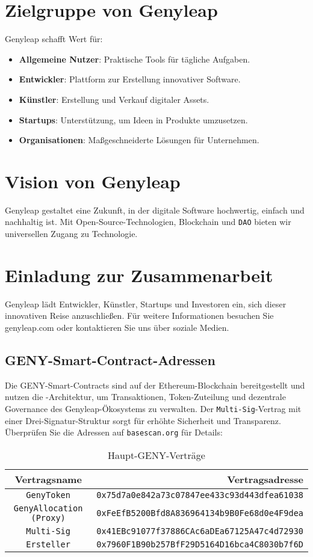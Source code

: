 \documentclass[a4paper,12pt,openany]{book}
\begin{document}
\chapter{Zielgruppe von Genyleap}
Genyleap schafft Wert für:
\begin{itemize}
    \item \textbf{Allgemeine Nutzer}: Praktische Tools für tägliche Aufgaben.
    \item \textbf{Entwickler}: Plattform zur Erstellung innovativer Software.
    \item \textbf{Künstler}: Erstellung und Verkauf digitaler Assets.
    \item \textbf{Startups}: Unterstützung, um Ideen in Produkte umzusetzen.
    \item \textbf{Organisationen}: Maßgeschneiderte Lösungen für Unternehmen.
\end{itemize}

\chapter{Vision von Genyleap}
Genyleap gestaltet eine Zukunft, in der digitale Software hochwertig, einfach und nachhaltig ist. Mit Open-Source-Technologien, Blockchain und \texttt{DAO} bieten wir universellen Zugang zu Technologie.

\chapter{Einladung zur Zusammenarbeit}
Genyleap lädt Entwickler, Künstler, Startups und Investoren ein, sich dieser innovativen Reise anzuschließen. Für weitere Informationen besuchen Sie genyleap.com oder kontaktieren Sie uns über soziale Medien.

\section*{GENY-Smart-Contract-Adressen}
Die GENY-Smart-Contracts sind auf der Ethereum-Blockchain bereitgestellt und nutzen die -Architektur, um Transaktionen, Token-Zuteilung und dezentrale Governance des Genyleap-Ökosystems zu verwalten. Der \texttt{Multi-Sig}-Vertrag mit einer Drei-Signatur-Struktur sorgt für erhöhte Sicherheit und Transparenz. Überprüfen Sie die Adressen auf \texttt{basescan.org} für Details:

\begin{table}[h]
\centering
\caption*{Haupt-GENY-Verträge}
\small
\begin{tabular}{c r}
\hline
\textbf{Vertragsname} & \textbf{Vertragsadresse} \\
\hline
\texttt{GenyToken} & {\texttt{0x75d7a0e842a73c07847ee433c93d443dfea61038}} \\
\texttt{GenyAllocation (Proxy)} & {\texttt{0xFeEfB5200Bfd8A836964134b9B0Fe68d0e4F9dea}} \\
\texttt{Multi-Sig} & {\texttt{0x41EBc91077f37886CAc6aDEa67125A47c4d72930}} \\
\texttt{Ersteller} & {\texttt{0x7960F1B90b257BfF29D5164D16bca4C8030b7f6D}} \\
\hline
\end{tabular}
\end{table}
\end{document}

